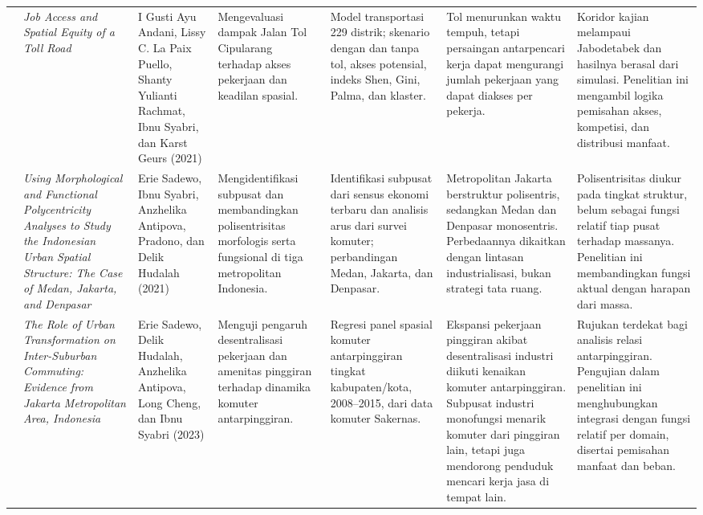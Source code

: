 \documentclass[12pt,a4paper,oneside,openany,indonesian]{report}
\begin{document}
\begin{landscape}
\begin{longtable}{>{\centering\arraybackslash}p{0.55cm}p{3.4cm}p{3.0cm}p{3.6cm}p{3.9cm}p{4.0cm}p{4.5cm}}
11 & \textit{Job Access and Spatial Equity of a Toll Road} & I Gusti Ayu Andani, Lissy C. La Paix Puello, Shanty Yulianti Rachmat, Ibnu Syabri, dan Karst Geurs (2021) & Mengevaluasi dampak Jalan Tol Cipularang terhadap akses pekerjaan dan keadilan spasial. & Model transportasi 229 distrik; skenario dengan dan tanpa tol, akses potensial, indeks Shen, Gini, Palma, dan klaster. & Tol menurunkan waktu tempuh, tetapi persaingan antarpencari kerja dapat mengurangi jumlah pekerjaan yang dapat diakses per pekerja. & Koridor kajian melampaui Jabodetabek dan hasilnya berasal dari simulasi. Penelitian ini mengambil logika pemisahan akses, kompetisi, dan distribusi manfaat.\\
12 & \textit{Using Morphological and Functional Polycentricity Analyses to Study the Indonesian Urban Spatial Structure: The Case of Medan, Jakarta, and Denpasar} & Erie Sadewo, Ibnu Syabri, Anzhelika Antipova, Pradono, dan Delik Hudalah (2021) & Mengidentifikasi subpusat dan membandingkan polisentrisitas morfologis serta fungsional di tiga metropolitan Indonesia. & Identifikasi subpusat dari sensus ekonomi terbaru dan analisis arus dari survei komuter; perbandingan Medan, Jakarta, dan Denpasar. & Metropolitan Jakarta berstruktur polisentris, sedangkan Medan dan Denpasar monosentris. Perbedaannya dikaitkan dengan lintasan industrialisasi, bukan strategi tata ruang. & Polisentrisitas diukur pada tingkat struktur, belum sebagai fungsi relatif tiap pusat terhadap massanya. Penelitian ini membandingkan fungsi aktual dengan harapan dari massa.\\
13 & \textit{The Role of Urban Transformation on Inter-Suburban Commuting: Evidence from Jakarta Metropolitan Area, Indonesia} & Erie Sadewo, Delik Hudalah, Anzhelika Antipova, Long Cheng, dan Ibnu Syabri (2023) & Menguji pengaruh desentralisasi pekerjaan dan amenitas pinggiran terhadap dinamika komuter antarpinggiran. & Regresi panel spasial komuter antarpinggiran tingkat kabupaten/kota, 2008--2015, dari data komuter Sakernas. & Ekspansi pekerjaan pinggiran akibat desentralisasi industri diikuti kenaikan komuter antarpinggiran. Subpusat industri monofungsi menarik komuter dari pinggiran lain, tetapi juga mendorong penduduk mencari kerja jasa di tempat lain. & Rujukan terdekat bagi analisis relasi antarpinggiran. Pengujian dalam penelitian ini menghubungkan integrasi dengan fungsi relatif per domain, disertai pemisahan manfaat dan beban.\\
\end{longtable}
\end{landscape}
\clearpage
\end{document}
